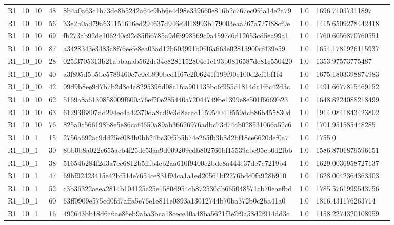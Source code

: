 \begin{tabular}{llllll}
 R1\_10\_10 & 48 & 8b4a0a63c1b73de8b5242a64e9bb6e4d98e339660e816b2c767ec0fda14e2a79 & 1.0 & 1696.71037311897 &  \\
 R1\_10\_10 & 56 & 33e2b0ad79a631151616ed294637d946e9018993b179003eaa267a727f88cf9e & 1.0 & 1415.6509278442418 &  \\
 R1\_10\_10 & 69 & fb273ab92de106240c92c85f56785a9df6998569c9a4597c6d12653cd5ea99a1 & 1.0 & 1760.6056870760551 &  \\
 R1\_10\_10 & 87 & a3428343e3483c8f76eefe8ea03ad12b603991b0f46a663e02813900cf439e59 & 1.0 & 1654.1781926115937 &  \\
 R1\_10\_10 & 28 & 025f3705313b21abbaaab562dc34c8281152804e1e193b0816587de81c550420 & 1.0 & 1353.97573775487 &  \\
 R1\_10\_10 & 40 & a3f895d5b5bc5789460c7e0cb890bcd1f67e2f06241f199f90e100d2cf1bf1f4 & 1.0 & 1675.1803398874983 &  \\
 R1\_10\_10 & 42 & 09d9b8ee9d7b7b2d8c4a8295396d08c1fca901135bc6f955d1814dc1f6c42d3c & 1.0 & 1491.6677815469152 &  \\
 R1\_10\_10 & 62 & 5169a8a6130858009f600a76ef20e285440a72044749be1399e8e501f6669b23 & 1.0 & 1648.8224088218499 &  \\
 R1\_10\_10 & 63 & 61293f6807dd294ec4a42370da8cd9c3d8ecac115954041f559dcb86b455830d & 1.0 & 1914.0841843423802 &  \\
 R1\_10\_10 & 76 & 825a9c566198b8e5e86caf4650a89ab36626976adbc73d74cb028531066a52c6 & 1.0 & 1701.951585448285 &  \\
 R1\_10\_1 & 15 & 2756a692ac9dd25ef084b0bb24bc30f5b5b74e265fb3b8d2bf18ce6620def0a7 & 1.0 & 1755.0 &  \\
 R1\_10\_1 & 30 & 8bb0b8a022c655acb4f25dc53aa9d009209edb802766bf15539abc95eb0d2fbb & 1.0 & 1586.8701879596151 &  \\
 R1\_10\_1 & 38 & 51654b284f2d3a7ec6812b5fffb4cb2aa610f9400e2bde8a444e37de7c7219b4 & 1.0 & 1629.0036958727137 &  \\
 R1\_10\_1 & 47 & 69bf92423415e42bf514e7654ce831f94ca1a1ed20561bf2276bdc0fa928b910 & 1.0 & 1628.0042364363303 &  \\
 R1\_10\_1 & 52 & c3b36322aeea2814b104125c25e1580d954cb872530db665048571cb70eaefbd & 1.0 & 1785.5761999543756 &  \\
 R1\_10\_1 & 60 & 63ff0909e575cd0fd7affa5e76e1e811e0893a13012744b70ba372b0c2ba41a0 & 1.0 & 1816.431176263714 &  \\
 R1\_10\_1 & 16 & 492643bb18d6a6ae86eb9aba3bca18cece30a48ba5621f3e2f9a58d2f914dd3c & 1.0 & 1158.2274320108959 &  \\

\end{tabular}
